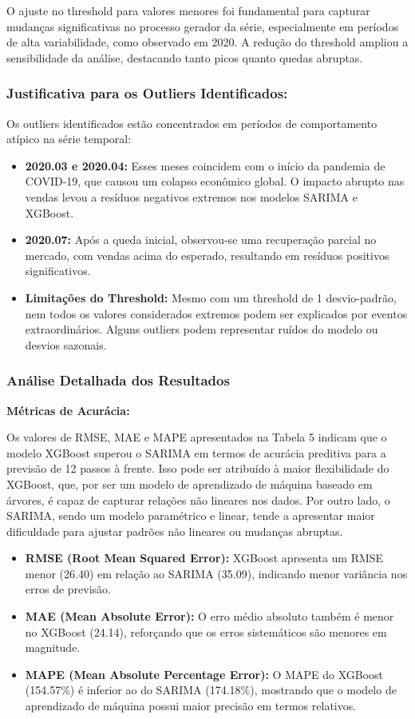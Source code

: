 \documentclass[a4paper, 12pt]{article}
\begin{document}
O ajuste no threshold para valores menores foi fundamental para capturar mudanças significativas no processo gerador da série, especialmente em períodos de alta variabilidade, como observado em 2020. A redução do threshold ampliou a sensibilidade da análise, destacando tanto picos quanto quedas abruptas.

\subsubsection{Justificativa para os Outliers Identificados:}

Os outliers identificados estão concentrados em períodos de comportamento atípico na série temporal:

\begin{itemize}
    \item \textbf{2020.03 e 2020.04:} Esses meses coincidem com o início da pandemia de COVID-19, que causou um colapso econômico global. O impacto abrupto nas vendas levou a resíduos negativos extremos nos modelos SARIMA e XGBoost.
    \item \textbf{2020.07:} Após a queda inicial, observou-se uma recuperação parcial no mercado, com vendas acima do esperado, resultando em resíduos positivos significativos.
    \item \textbf{Limitações do Threshold:} Mesmo com um threshold de 1 desvio-padrão, nem todos os valores considerados extremos podem ser explicados por eventos extraordinários. Alguns outliers podem representar ruídos do modelo ou desvios sazonais.
\end{itemize}

\subsubsection{Análise Detalhada dos Resultados}

\textbf{Métricas de Acurácia:} 

Os valores de RMSE, MAE e MAPE apresentados na Tabela 5 indicam que o modelo XGBoost superou o SARIMA em termos de acurácia preditiva para a previsão de 12 passos à frente. Isso pode ser atribuído à maior flexibilidade do XGBoost, que, por ser um modelo de aprendizado de máquina baseado em árvores, é capaz de capturar relações não lineares nos dados. Por outro lado, o SARIMA, sendo um modelo paramétrico e linear, tende a apresentar maior dificuldade para ajustar padrões não lineares ou mudanças abruptas.

\begin{itemize}
    \item \textbf{RMSE (Root Mean Squared Error):} XGBoost apresenta um RMSE menor (26.40) em relação ao SARIMA (35.09), indicando menor variância nos erros de previsão.
    \item \textbf{MAE (Mean Absolute Error):} O erro médio absoluto também é menor no XGBoost (24.14), reforçando que os erros sistemáticos são menores em magnitude.
    \item \textbf{MAPE (Mean Absolute Percentage Error):} O MAPE do XGBoost (154.57\%) é inferior ao do SARIMA (174.18\%), mostrando que o modelo de aprendizado de máquina possui maior precisão em termos relativos.
\end{itemize}
\end{document}
